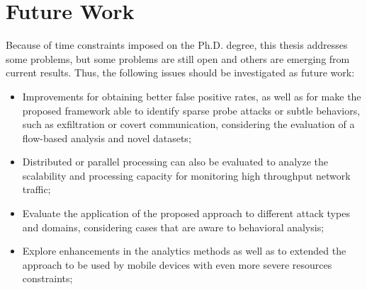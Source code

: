 \section{Future Work}
\label{sc:conc_futurework}

Because of time constraints imposed on the Ph.D. degree, this thesis addresses some problems, but some problems are still open and others are emerging from current results. Thus, the following issues should be investigated as future work:

\begin{itemize}
	\item Improvements for obtaining better false positive rates, as well as for make the proposed framework able to identify sparse probe attacks or subtle behaviors, such as exfiltration or covert communication, considering the evaluation of a flow-based analysis and novel datasets;
	\item Distributed or parallel processing can also be evaluated to analyze the scalability and processing capacity for monitoring high throughput network traffic;
	\item Evaluate the application of the proposed approach to different attack types and domains, considering cases that are aware to behavioral analysis;
	\item Explore enhancements in the analytics methods as well as to extended the approach to be used by mobile devices with even more severe resources constraints;
\end{itemize}